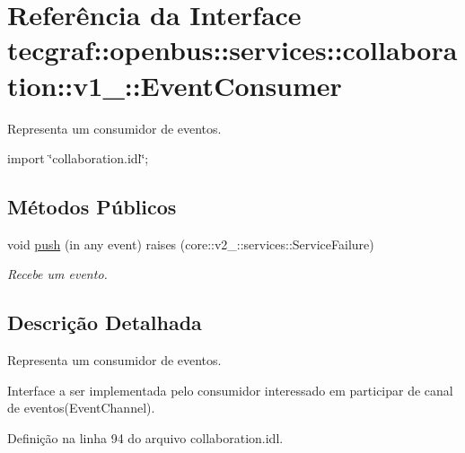 \hypertarget{interfacetecgraf_1_1openbus_1_1services_1_1collaboration_1_1v1__0_1_1EventConsumer}{\section{\-Referência da \-Interface tecgraf\-:\-:openbus\-:\-:services\-:\-:collaboration\-:\-:v1\-\_\-:\-:\-Event\-Consumer}
\label{interfacetecgraf_1_1openbus_1_1services_1_1collaboration_1_1v1__0_1_1EventConsumer}
}


\-Representa um consumidor de eventos.  




{\ttfamily import \char`\"{}collaboration.\-idl\char`\"{};}

\subsection*{\-Métodos \-Públicos}
\begin{DoxyCompactItemize}
\item 
void \hyperlink{interfacetecgraf_1_1openbus_1_1services_1_1collaboration_1_1v1__0_1_1EventConsumer_ac4f208907a4ff7158537d807f0ba6f95}{push} (in any event)  raises (core\-::v2\-\_\-::services\-::\-Service\-Failure)
\begin{DoxyCompactList}\small\item\em \-Recebe um evento. \end{DoxyCompactList}\end{DoxyCompactItemize}


\subsection{\-Descrição \-Detalhada}
\-Representa um consumidor de eventos. 

\-Interface a ser implementada pelo consumidor interessado em participar de canal de eventos(\-Event\-Channel). 

\-Definição na linha 94 do arquivo collaboration.\-idl.



